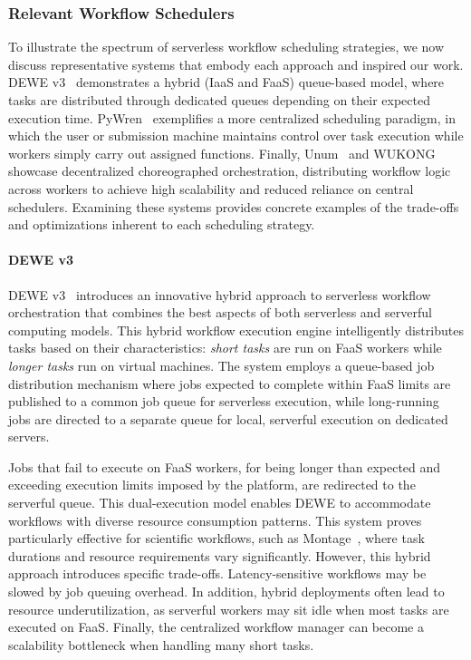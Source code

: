 \begin{itemize}
\subsubsection{Relevant Workflow Schedulers}

To illustrate the spectrum of serverless workflow scheduling strategies, we now discuss representative systems that embody each approach and inspired our work. DEWE v3~\cite{dewe_v3} demonstrates a hybrid (IaaS and FaaS) queue-based model, where tasks are distributed through dedicated queues depending on their expected execution time. PyWren~\cite{pywren} exemplifies a more centralized scheduling paradigm, in which the user or submission machine maintains control over task execution while workers simply carry out assigned functions. Finally, Unum~\cite{unum_decentralized_orchestrator} and WUKONG~\cite{wukong_2} showcase decentralized choreographed orchestration, distributing workflow logic across workers to achieve high scalability and reduced reliance on central schedulers. Examining these systems provides concrete examples of the trade-offs and optimizations inherent to each scheduling strategy.

\paragraph{DEWE v3}
DEWE v3~\cite{dewe_v3} introduces an innovative hybrid approach to serverless workflow orchestration that combines the best aspects of both serverless and serverful computing models. This hybrid workflow execution engine intelligently distributes tasks based on their characteristics: \textit{short tasks} are run on FaaS workers while \textit{longer tasks} run on virtual machines. The system employs a queue-based job distribution mechanism where jobs expected to complete within FaaS limits are published to a common job queue for serverless execution, while long-running jobs are directed to a separate queue for local, serverful execution on dedicated servers. 

Jobs that fail to execute on FaaS workers, for being longer than expected and exceeding execution limits imposed by the platform, are redirected to the serverful queue. This dual-execution model enables DEWE to accommodate workflows with diverse resource consumption patterns. This system proves particularly effective for scientific workflows, such as Montage~\cite{montage_astronomy}, where task durations and resource requirements vary significantly. However, this hybrid approach introduces specific trade-offs. Latency-sensitive workflows may be slowed by job queuing overhead. In addition, hybrid deployments often lead to resource underutilization, as serverful workers may sit idle when most tasks are executed on FaaS. Finally, the centralized workflow manager can become a scalability bottleneck when handling many short tasks.


\end{itemize}
